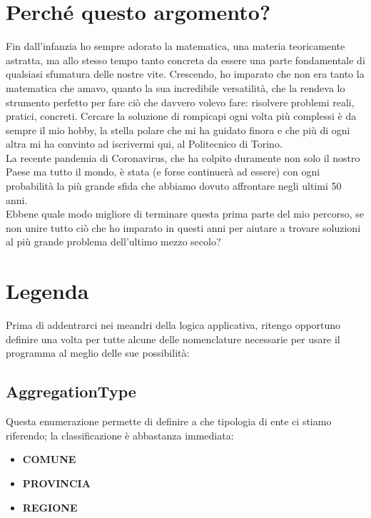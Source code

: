 \documentclass[a4paper, 12pt]{article}
\begin{document}
\newpage

\section{Perché questo argomento?}
	Fin dall'infanzia ho sempre adorato la matematica, una materia teoricamente astratta, ma allo stesso tempo tanto concreta da essere una parte fondamentale di qualsiasi sfumatura delle nostre vite.
	Crescendo, ho imparato che non era tanto la matematica che amavo, quanto la sua incredibile versatilità, che la rendeva lo strumento perfetto per fare ciò che davvero volevo fare: risolvere problemi reali, pratici, concreti.
	Cercare la soluzione di rompicapi ogni volta più complessi è da sempre il mio hobby, la stella polare che mi ha guidato finora e che più di ogni altra mi ha convinto ad iscrivermi qui, al Politecnico di Torino.\\
	La recente pandemia di Coronavirus, che ha colpito duramente non solo il nostro Paese ma tutto il mondo, è stata (e forse continuerà ad essere) con ogni probabilità la più grande sfida che abbiamo dovuto affrontare negli ultimi 50 anni.\\
	Ebbene quale modo migliore di terminare questa prima parte del mio percorso, se non unire tutto ciò che ho imparato in questi anni per aiutare a trovare soluzioni al più grande problema dell'ultimo mezzo secolo?

\newpage

\section{Legenda}

	Prima di addentrarci nei meandri della logica applicativa, ritengo opportuno definire una volta per tutte alcune delle nomenclature necessarie per usare il programma al meglio delle sue possibilità:
	
	\subsection{AggregationType}
		Questa enumerazione permette di definire a che tipologia di ente ci stiamo riferendo; la classificazione è abbastanza immediata:
		
		\begin{itemize}
			\item \textbf{COMUNE}
			\item \textbf{PROVINCIA}
			\item \textbf{REGIONE}
		\end{itemize}
	
\end{document}
